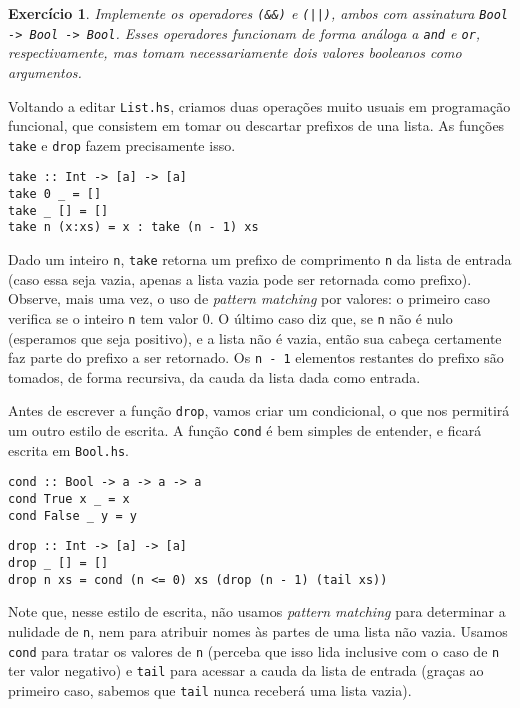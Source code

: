 \documentclass[a4paper]{article}
\newtheorem{exercicio}{Exercício}
\begin{document}
\begin{exercicio}
	Implemente os operadores \emph{\texttt{(\&\&)}} e \emph{\texttt{(||)}}, ambos com assinatura \emph{\texttt{Bool -> Bool -> Bool}}.
	Esses operadores funcionam de forma análoga a \emph{\texttt{and}} e \emph{\texttt{or}}, respectivamente, mas tomam necessariamente dois valores booleanos como argumentos.
\end{exercicio}

Voltando a editar \texttt{List.hs}, criamos duas operações muito usuais em programação funcional, que consistem em tomar ou descartar prefixos de una lista.
As funções \texttt{take} e \texttt{drop} fazem precisamente isso.

\begin{verbatim}
take :: Int -> [a] -> [a]
take 0 _ = []
take _ [] = []
take n (x:xs) = x : take (n - 1) xs
\end{verbatim}

Dado um inteiro \texttt{n}, \texttt{take} retorna um prefixo de comprimento \texttt{n} da lista de entrada (caso essa seja vazia, apenas a lista vazia pode ser retornada como prefixo).
Observe, mais uma vez, o uso de \emph{pattern matching} por valores: o primeiro caso verifica se o inteiro \texttt{n} tem valor 0.
O último caso diz que, se \texttt{n} não é nulo (esperamos que seja positivo), e a lista não é vazia, então sua cabeça certamente faz parte do prefixo a ser retornado. Os \texttt{n - 1} elementos restantes do prefixo são tomados, de forma recursiva, da cauda da lista dada como entrada.

Antes de escrever a função \texttt{drop}, vamos criar um condicional, o que nos permitirá um outro estilo de escrita.
A função \texttt{cond} é bem simples de entender, e ficará escrita em \texttt{Bool.hs}.

\begin{verbatim}
cond :: Bool -> a -> a -> a
cond True x _ = x
cond False _ y = y
\end{verbatim}

\begin{verbatim}
drop :: Int -> [a] -> [a]
drop _ [] = []
drop n xs = cond (n <= 0) xs (drop (n - 1) (tail xs))
\end{verbatim}

Note que, nesse estilo de escrita, não usamos \emph{pattern matching} para determinar a nulidade de \texttt{n}, nem para atribuir nomes às partes de uma lista não vazia.
Usamos \texttt{cond} para tratar os valores de \texttt{n} (perceba que isso lida inclusive com o caso de \texttt{n} ter valor negativo) e \texttt{tail} para acessar a cauda da lista de entrada (graças ao primeiro caso, sabemos que \texttt{tail} nunca receberá uma lista vazia).
\end{document}
